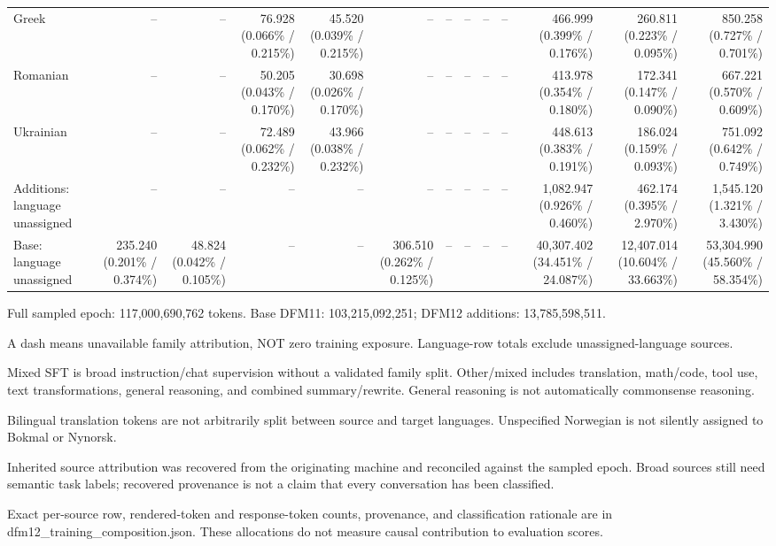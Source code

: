 \documentclass[10pt]{article}
\begin{document}
{\begin{tabular}{lrrrrrrrrrrrr}
Greek & -- & -- & 76.928 (0.066\% / 0.215\%) & 45.520 (0.039\% / 0.215\%) & -- & -- & -- & -- & -- & 466.999 (0.399\% / 0.176\%) & 260.811 (0.223\% / 0.095\%) & 850.258 (0.727\% / 0.701\%) \\
Romanian & -- & -- & 50.205 (0.043\% / 0.170\%) & 30.698 (0.026\% / 0.170\%) & -- & -- & -- & -- & -- & 413.978 (0.354\% / 0.180\%) & 172.341 (0.147\% / 0.090\%) & 667.221 (0.570\% / 0.609\%) \\
Ukrainian & -- & -- & 72.489 (0.062\% / 0.232\%) & 43.966 (0.038\% / 0.232\%) & -- & -- & -- & -- & -- & 448.613 (0.383\% / 0.191\%) & 186.024 (0.159\% / 0.093\%) & 751.092 (0.642\% / 0.749\%) \\
Additions: language unassigned & -- & -- & -- & -- & -- & -- & -- & -- & -- & 1,082.947 (0.926\% / 0.460\%) & 462.174 (0.395\% / 2.970\%) & 1,545.120 (1.321\% / 3.430\%) \\
Base: language unassigned & 235.240 (0.201\% / 0.374\%) & 48.824 (0.042\% / 0.105\%) & -- & -- & 306.510 (0.262\% / 0.125\%) & -- & -- & -- & -- & 40,307.402 (34.451\% / 24.087\%) & 12,407.014 (10.604\% / 33.663\%) & 53,304.990 (45.560\% / 58.354\%) \\
\bottomrule\end{tabular}}
\par\bigskip
Full sampled epoch: 117,000,690,762 tokens. Base DFM11: 103,215,092,251; DFM12 additions: 13,785,598,511.\par\smallskip
A dash means unavailable family attribution, NOT zero training exposure. Language-row totals exclude unassigned-language sources.\par\smallskip
Mixed SFT is broad instruction/chat supervision without a validated family split. Other/mixed includes translation, math/code, tool use, text transformations, general reasoning, and combined summary/rewrite. General reasoning is not automatically commonsense reasoning.\par\smallskip
Bilingual translation tokens are not arbitrarily split between source and target languages. Unspecified Norwegian is not silently assigned to Bokmal or Nynorsk.\par\smallskip
Inherited source attribution was recovered from the originating machine and reconciled against the sampled epoch. Broad sources still need semantic task labels; recovered provenance is not a claim that every conversation has been classified.\par\smallskip
Exact per-source row, rendered-token and response-token counts, provenance, and classification rationale are in dfm12\_training\_composition.json. These allocations do not measure causal contribution to evaluation scores.\par\smallskip
\clearpage
\end{document}

